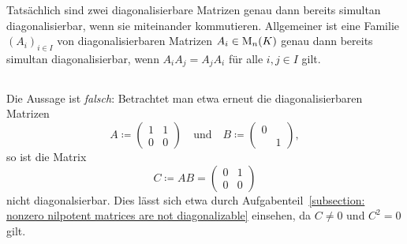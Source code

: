 \begin{remark}
  Tatsächlich sind zwei diagonalisierbare Matrizen genau dann bereits simultan diagonalisierbar, wenn sie miteinander kommutieren.
  Allgemeiner ist eine Familie $(A_i)_{i \in I}$ von diagonalisierbaren Matrizen $A_i \in \operatorname{M}_{n}(K)$ genau dann bereits simultan diagonalisierbar, wenn $A_i A_j = A_j A_i$ für alle $i,j \in I$ gilt.
\end{remark}





\subsection{}

Die Aussage ist \emph{falsch}:
Betrachtet man etwa erneut die diagonalisierbaren Matrizen
\[
            A
  \coloneqq \begin{pmatrix}
              1 & 1
              \\
              0 & 0
            \end{pmatrix}
  \quad\text{und}\quad
            B
  \coloneqq \begin{pmatrix}
              0 & 
              \\
                & 1
            \end{pmatrix},
\]
so ist die Matrix
\[
            C            
  \coloneqq AB
  =         \begin{pmatrix}
            0 & 1
            \\
            0 & 0
            \end{pmatrix}
\]
nicht diagonalsierbar.
Dies lässt sich etwa durch Aufgabenteil~\ref{subsection: nonzero nilpotent matrices are not diagonalizable} einsehen, da $C \neq 0$ und $C^2 = 0$ gilt.

